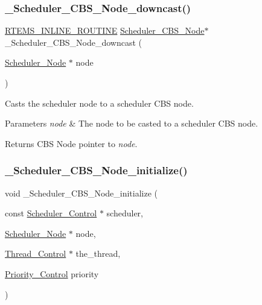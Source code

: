 \subsubsection{\texorpdfstring{\_Scheduler\_CBS\_Node\_downcast()}{\_Scheduler\_CBS\_Node\_downcast()}}
{\footnotesize\ttfamily \mbox{\hyperlink{group__RTEMSScoreBaseDefs_gac216239df231d5dbd15e3520b0b9313f}{R\+T\+E\+M\+S\+\_\+\+I\+N\+L\+I\+N\+E\+\_\+\+R\+O\+U\+T\+I\+NE}} \mbox{\hyperlink{structScheduler__CBS__Node}{Scheduler\+\_\+\+C\+B\+S\+\_\+\+Node}}$\ast$ \+\_\+\+Scheduler\+\_\+\+C\+B\+S\+\_\+\+Node\+\_\+downcast (\begin{DoxyParamCaption}\item[{\mbox{\hyperlink{structScheduler__Node}{Scheduler\+\_\+\+Node}} $\ast$}]{node }\end{DoxyParamCaption})}



Casts the scheduler node to a scheduler C\+BS node. 


\begin{DoxyParams}{Parameters}
{\em node} & The node to be casted to a scheduler C\+BS node.\\
\hline
\end{DoxyParams}
\begin{DoxyReturn}{Returns}
C\+BS Node pointer to {\itshape node}. 
\end{DoxyReturn}
\mbox{\label{group__RTEMSScoreSchedulerCBS_gabb8137112e3b30c70daa4dc3221093cb}} 
\subsubsection{\texorpdfstring{\_Scheduler\_CBS\_Node\_initialize()}{\_Scheduler\_CBS\_Node\_initialize()}}
{\footnotesize\ttfamily void \+\_\+\+Scheduler\+\_\+\+C\+B\+S\+\_\+\+Node\+\_\+initialize (\begin{DoxyParamCaption}\item[{const \mbox{\hyperlink{struct__Scheduler__Control}{Scheduler\+\_\+\+Control}} $\ast$}]{scheduler,  }\item[{\mbox{\hyperlink{structScheduler__Node}{Scheduler\+\_\+\+Node}} $\ast$}]{node,  }\item[{\mbox{\hyperlink{struct__Thread__Control}{Thread\+\_\+\+Control}} $\ast$}]{the\+\_\+thread,  }\item[{\mbox{\hyperlink{group__RTEMSScorePriority_ga59d02b58072d31a9a1cfe644557aefe2}{Priority\+\_\+\+Control}}}]{priority }\end{DoxyParamCaption})}



